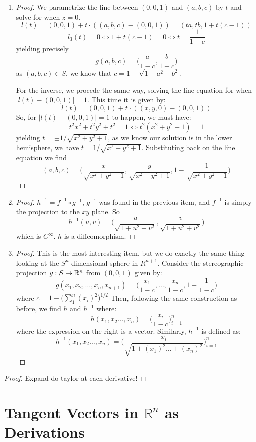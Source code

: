 \begin{problem}
\end{problem}
\begin{enumerate}[label=(\alph*)]
	\item \begin{proof}
		      We parametrize the line between $(0,0,1)$ and $(a,b,c)$ by $t$ and solve for when $z = 0$.
		      $$l(t) = (0,0,1) + t \cdot ((a,b,c) - (0,0,1)) = (ta, tb, 1 + t(c-1))$$
		      $$l_3(t) = 0 \iff 1 + t(c-1) = 0 \iff t = \frac{1}{1-c}$$
		      yielding precisely
		      $$g(a,b,c) = \bigg( \frac{a}{1-c}, \frac{b}{1-c} \bigg)$$
		      as $(a,b,c) \in S$, we know that $c = 1 - \sqrt{1 - a^2 - b^2}$.

		      For the inverse, we procede the same way, solving the line equation for when $|l(t) - (0,0,1)| = 1$.
		      This time it is given by:
		      $$l(t) = (0,0,1) + t\cdot ((x,y,0) - (0,0,1))$$
		      So, for $|l(t) - (0,0,1)| = 1$ to happen, we must have:
		      $$t^2x^2 +t^2y^2 +t^2 = 1 \iff t^2(x^2 + y^2 + 1) = 1$$
		      yielding $t = \pm 1/\sqrt{x^2 + y^2  +1}$, as we know our solution is in the lower hemisphere, we have
		      $t = 1/\sqrt{x^2 + y^2  +1}$. Substituting back on the line equation we find
		      $$(a,b,c) = \bigg(\frac{x}{\sqrt{x^2 + y^2 + 1}}, \frac{y}{\sqrt{x^2 + y^2 + 1}}, 1 - \frac{1}{\sqrt{x^2 + y^2 + 1}}\bigg)$$
	      \end{proof}
	\item \begin{proof}
		      $h^{-1} = f^{-1} \circ g^{-1}$, $g^{-1}$ was found in the previous item, and $f^{-1}$ is simply the projection
		      to the $xy$ plane. So
		      $$h^{-1}(u,v) = \bigg(\frac{u}{\sqrt{1 + u^2 + v^2}}, \frac{v}{\sqrt{1 + u^2 + v^2}} \bigg)$$
		      which is $C^\infty$. $h$ is a diffeomorphism.
	      \end{proof}

	\item \begin{proof}
		      This is the most interesting item, but we do exactly the same thing looking at the $S^n$ dimensional sphere in $R^{n+1}$.
		      Consider the stereographic projection $g: S \rightarrow \mathbb{R}^n$ from $(0,0,1)$ given by:
		      $$g(x_1, x_2, \dots, x_n, x_{n+1}) = \bigg(\frac{x_1}{1 - c}, \dots, \frac{x_{n}}{1-c}, 1 - \frac{1}{1 - c}\bigg)$$
		      where $c = 1 - \bigg(\sum_{1}^{n} (x_i)^2\bigg)^{1/2}$
		      Then, following the same construction as before, we find $h$ and $h^{-1}$ where:
		      $$h(x_1,x_2 \dots, x_n) = \bigg(\frac{x_i}{1 - c} \bigg)_{i=1}^{n}$$
		      where the expression on the right is a vector. Similarly, $h^{-1}$ is defined as:
		      $$h^{-1}(x_1,x_2 \dots, x_n) = \Bigg(\frac{x_i}{\sqrt{1 + (x_1)^2 \dots + (x_n)^2}} \Bigg)_{i=1}^{n}$$
	      \end{proof}
\end{enumerate}

\begin{problem}
\end{problem}

\begin{proof}
	Expand do taylor at each derivative!
\end{proof}

\section{Tangent Vectors in $\mathbb{R}^n$ as Derivations}
